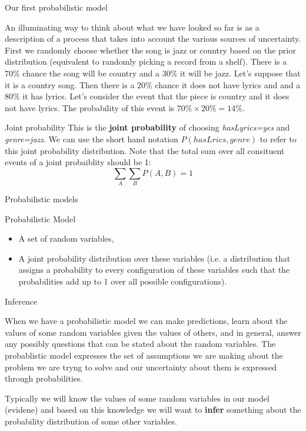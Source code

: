 \documentclass[12pt]{beamer}
\begin{document}
\begin{frame}{Our first probabilistic model}

  An illuminating way to think about what we have looked so far is as
  a description of a process that takes into account the various
  sources of uncertainty. First we randomly choose whether the song is
  jazz or country based on the prior distribution (equivalent to
  randomly picking a record from a shelf). There is a $70\%$ chance
  the song will be country and a $30\%$ it will be jazz. Let's suppose
  that it is a country song. Then there is a $20\%$ chance it does not
  have lyrics and and a $80\%$ it has lyrics. Let's consider the event
  that the piece is country and it does not have lyrics. The
  probability of this event is $70\% \times 20\% = 14\%$.
\end{frame}

\begin{frame}{Joint probability} 
  This is the {\bf joint
    probability} of choosing {\it hasLyrics=yes} and {\it genre=jazz}.
  We can use the short hand notation $P(hasLrics, genre)$ to refer to
  this joint probability distribution. Note that the total sum over
  all consituent events of a joint probaiblity should be 1:
  \[
  \sum_{A} \sum_{B} P(A,B) = 1 
  \]
\end{frame}

\begin{frame}{Probabilistic models}
  \begin{definition}{Probabilistic Model}
     \begin{itemize}
     \item   A set of random variables,
       \item A joint probability distribution over these variables
         (i.e. a distribution that assigns a probability to every
         configuration of these variables such that the probabilities
         add up to 1 over all possible configurations).
     \end{itemize}
\end{definition}
\end{frame}

\begin{frame}{Inference}

When we have a probabilistic model we can make predictions, learn
about the values of some random variables given the values of others,
and in general, answer any possibly questions that can be stated about
the random variables. The probablistic model expresses the set of
assumptions we are making about the problem we are tryng to solve and
our uncertainty about them is expressed through probabilities.

Typically we will know the values of some random variables in our
model (evidene) and based on this knowledge we will want to {\bf
  infer} something about the probability distribution of some other
variables.

\end{frame}
\end{document}
